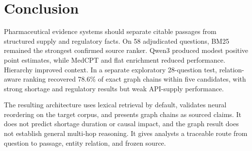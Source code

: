 \section{Conclusion}
\label{sec:conclusion}

Pharmaceutical evidence systems should separate citable passages from structured supply and regulatory facts. On 58 adjudicated questions, BM25 remained the strongest confirmed source ranker. Qwen3 produced modest positive point estimates, while MedCPT and flat enrichment reduced performance. Hierarchy improved context. In a separate exploratory 28-question test, relation-aware ranking recovered 78.6\% of exact graph chains within five candidates, with strong shortage and regulatory results but weak API-supply performance.

The resulting architecture uses lexical retrieval by default, validates neural reordering on the target corpus, and presents graph chains as sourced claims. It does not predict shortage duration or causal impact, and the graph result does not establish general multi-hop reasoning. It gives analysts a traceable route from question to passage, entity relation, and frozen source.
